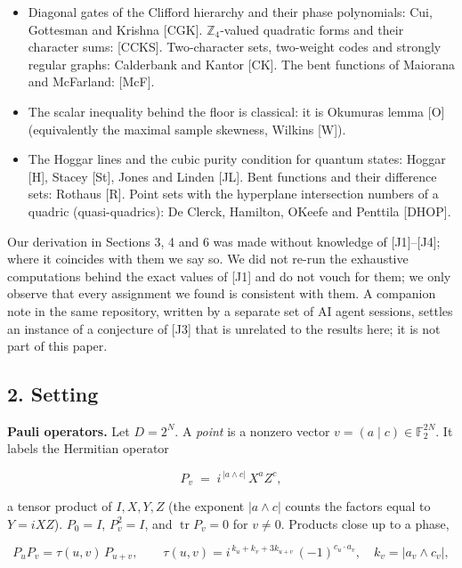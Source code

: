 \documentclass[11pt,a4paper]{article}
\begin{document}
\begin{itemize}
  all squared Pauli expectation values in \(\{0, 2^{-N}\}\). None of {[}LLY, Ci, K{]} discusses contextuality,
  phase states, or more than five qubits.
\item
  Diagonal gates of the Clifford hierarchy and their phase polynomials: Cui, Gottesman and Krishna
  {[}CGK{]}. \(\mathbb{Z}_4\)-valued quadratic forms and their character sums: {[}CCKS{]}. Two-character sets,
  two-weight codes and strongly regular graphs: Calderbank and Kantor {[}CK{]}. The bent functions of
  Maiorana and McFarland: {[}McF{]}.
\item
  The scalar inequality behind the floor is classical: it is Okumura\textquotesingle s lemma {[}O{]} (equivalently the
  maximal sample skewness, Wilkins {[}W{]}).
\item
  The Hoggar lines and the cubic purity condition for quantum states: Hoggar {[}H{]}, Stacey {[}St{]},
  Jones and Linden {[}JL{]}. Bent functions and their difference sets: Rothaus {[}R{]}. Point sets with the
  hyperplane intersection numbers of a quadric (quasi-quadrics): De Clerck, Hamilton, O\textquotesingle Keefe and
  Penttila {[}DHOP{]}.
\end{itemize}

Our derivation in Sections 3, 4 and 6 was made without knowledge of {[}J1{]}--{[}J4{]}; where it coincides with
them we say so. We did not re-run the exhaustive computations behind the exact values of {[}J1{]} and do
not vouch for them; we only observe that every assignment we found is consistent with them. A companion
note in the same repository, written by a separate set of AI agent sessions, settles an instance of a
conjecture of {[}J3{]} that is unrelated to the results here; it is not part of this paper.

\subsection{2. Setting}\label{2-setting}

\textbf{Pauli operators.} Let \(D = 2^N\). A \emph{point} is a nonzero vector \(v = (a \mid c) \in \mathbb{F}_2^{2N}\).
It labels the Hermitian operator

\[P_v \;=\; i^{\,|a \wedge c|}\, X^{a} Z^{c},\]

a tensor product of \(I, X, Y, Z\) (the exponent \(|a \wedge c|\) counts the factors equal to \(Y = iXZ\)).
\(P_0 = I\), \(P_v^2 = I\), and \(\operatorname{tr} P_v = 0\) for \(v \ne 0\). Products close up to a phase,

\[P_u P_v = \tau(u,v)\, P_{u+v}, \qquad
\tau(u,v) = i^{\,k_u + k_v + 3 k_{u+v}}\,(-1)^{c_u \cdot a_v}, \quad k_v = |a_v \wedge c_v| ,\]
\end{document}
